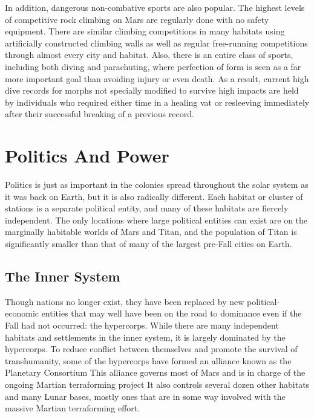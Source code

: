 In addition, dangerous non-combative sports are 
also popular. The highest levels of competitive rock 
climbing on Mars are regularly done with no safety 
equipment. There are similar climbing competitions 
in many habitats using artificially constructed climbing
walls as well as regular free-running competitions
through almost every city and habitat. Also, there is 
an entire class of sports, including both diving and 
parachuting, where perfection of form is seen as 
a far more important goal than avoiding injury or 
even death. As a result, current high dive records for 
morphs not specially modified to survive high impacts 
are held by individuals who required either time in a 
healing vat or resleeving immediately after their successful
breaking of a previous record.

\section{Politics And Power}

Politics is just as important in the colonies spread 
throughout the solar system as it was back on Earth, 
but it is also radically different. Each habitat or cluster 
of stations is a separate political entity, and many of 
these habitats are fiercely independent. The only locations
where large political entities can exist are on the
marginally habitable worlds of Mars and Titan, and 
the population of Titan is significantly smaller than 
that of many of the largest pre-Fall cities on Earth.

\subsection{The Inner System}

Though nations no longer exist, they have been replaced
by new political-economic entities that may
well have been on the road to dominance even if the 
Fall had not occurred: the hypercorps. While there 
are many independent habitats and settlements in the 
inner system, it is largely dominated by the hypercorps. 
To reduce conflict between themselves and promote 
the survival of transhumanity, some of the hypercorps 
have formed an alliance known as the Planetary Consortium
This alliance governs most of Mars and is
in charge of the ongoing Martian terraforming project
It also controls several dozen other habitats and
many Lunar bases, mostly ones that are in some way 
involved with the massive Martian terraforming effort.

